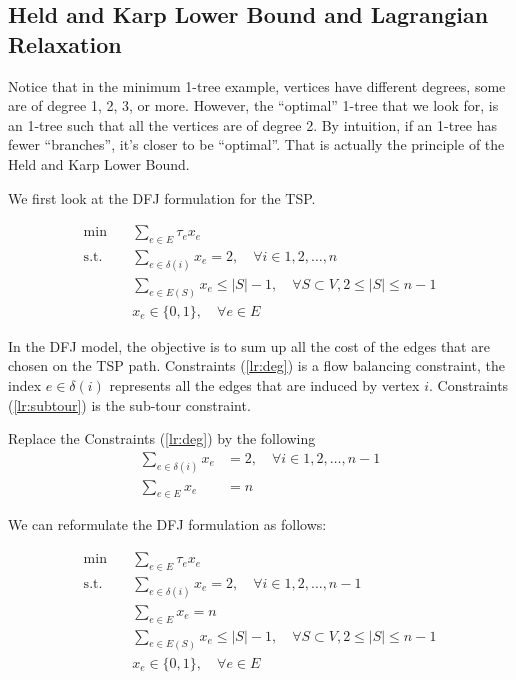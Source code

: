         \subsection{Held and Karp Lower Bound and Lagrangian Relaxation}
            Notice that in the minimum 1-tree example, vertices have different degrees, some are of degree 1, 2, 3, or more. However, the ``optimal'' 1-tree that we look for, is an 1-tree such that all the vertices are of degree 2. By intuition, if an 1-tree has fewer ``branches'', it's closer to be ``optimal''. That is actually the principle of the Held and Karp Lower Bound.

            We first look at the DFJ formulation for the TSP.

            \begin{align}
                \min \quad &\sum_{e \in E} \tau_e x_e \label{lr:obj}\\
                \text{s.t.} \quad & \sum_{e \in \delta(i)} x_e = 2, \quad \forall i \in 1, 2, \ldots, n\label{lr:deg}\\
                & \sum_{e \in E(S)} x_e \le |S| - 1, \quad \forall S \subset V, 2 \le |S| \le n - 1 \label{lr:subtour}\\
                & x_e \in \{0, 1\}, \quad \forall e \in E
            \end{align}

            In the DFJ model, the objective is to sum up all the cost of the edges that are chosen on the TSP path. Constraints (\ref{lr:deg}) is a flow balancing constraint, the index $e\in \delta(i)$ represents all the edges that are induced by vertex $i$. Constraints (\ref{lr:subtour}) is the sub-tour constraint.

            Replace the Constraints (\ref{lr:deg}) by the following
            \begin{align}
                \sum_{e \in \delta(i)} x_e &= 2, \quad \forall i \in 1, 2, \ldots, n - 1\\
                \sum_{e \in E} x_e &= n
            \end{align}

            We can reformulate the DFJ formulation as follows:

            \begin{align}
                \min \quad &\sum_{e \in E} \tau_e x_e\\
                \text{s.t.} \quad & \sum_{e \in \delta(i)} x_e = 2, \quad \forall i \in 1, 2, \ldots, n - 1\label{lr:ndeg}\\
                &\sum_{e \in E} x_e = n \label{lr:cycle}\\
                & \sum_{e \in E(S)} x_e \le |S| - 1, \quad \forall S \subset V, 2 \le |S| \le n - 1 \label{lr:nsubtour}\\
                & x_e \in \{0, 1\}, \quad \forall e \in E
            \end{align}

